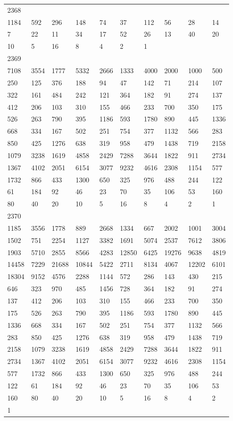 \begin{longtable}{*{10}{l}}
2368&&&&&&&&&\\
1184& 592& 296& 148& 74& 37& 112& 56& 28& 14\\
7& 22& 11& 34& 17& 52& 26& 13& 40& 20\\
10& 5& 16& 8& 4& 2& 1& \\

2369&&&&&&&&&\\
7108& 3554& 1777& 5332& 2666& 1333& 4000& 2000& 1000& 500\\
250& 125& 376& 188& 94& 47& 142& 71& 214& 107\\
322& 161& 484& 242& 121& 364& 182& 91& 274& 137\\
412& 206& 103& 310& 155& 466& 233& 700& 350& 175\\
526& 263& 790& 395& 1186& 593& 1780& 890& 445& 1336\\
668& 334& 167& 502& 251& 754& 377& 1132& 566& 283\\
850& 425& 1276& 638& 319& 958& 479& 1438& 719& 2158\\
1079& 3238& 1619& 4858& 2429& 7288& 3644& 1822& 911& 2734\\
1367& 4102& 2051& 6154& 3077& 9232& 4616& 2308& 1154& 577\\
1732& 866& 433& 1300& 650& 325& 976& 488& 244& 122\\
61& 184& 92& 46& 23& 70& 35& 106& 53& 160\\
80& 40& 20& 10& 5& 16& 8& 4& 2& 1\\

2370&&&&&&&&&\\
1185& 3556& 1778& 889& 2668& 1334& 667& 2002& 1001& 3004\\
1502& 751& 2254& 1127& 3382& 1691& 5074& 2537& 7612& 3806\\
1903& 5710& 2855& 8566& 4283& 12850& 6425& 19276& 9638& 4819\\
14458& 7229& 21688& 10844& 5422& 2711& 8134& 4067& 12202& 6101\\
18304& 9152& 4576& 2288& 1144& 572& 286& 143& 430& 215\\
646& 323& 970& 485& 1456& 728& 364& 182& 91& 274\\
137& 412& 206& 103& 310& 155& 466& 233& 700& 350\\
175& 526& 263& 790& 395& 1186& 593& 1780& 890& 445\\
1336& 668& 334& 167& 502& 251& 754& 377& 1132& 566\\
283& 850& 425& 1276& 638& 319& 958& 479& 1438& 719\\
2158& 1079& 3238& 1619& 4858& 2429& 7288& 3644& 1822& 911\\
2734& 1367& 4102& 2051& 6154& 3077& 9232& 4616& 2308& 1154\\
577& 1732& 866& 433& 1300& 650& 325& 976& 488& 244\\
122& 61& 184& 92& 46& 23& 70& 35& 106& 53\\
160& 80& 40& 20& 10& 5& 16& 8& 4& 2\\
1& \\


\end{longtable}
